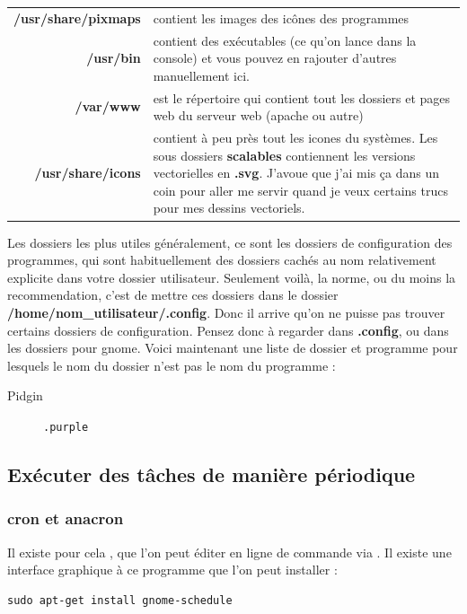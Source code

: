 \documentclass[a4paper,twoside]{article}
\begin{document}
\begin{tabular}{>{\bfseries}r<{}@{ : }p{9cm}}
/usr/share/pixmaps & contient les images des icônes des programmes\\
/usr/bin & contient des exécutables (ce qu'on lance dans la console) et vous pouvez en rajouter d'autres manuellement ici.\\
/var/www & est le répertoire qui contient tout les dossiers et pages web du serveur web (apache ou autre)\\
/usr/share/icons & contient à peu près tout les icones du systèmes. Les sous dossiers \textbf{scalables} contiennent les versions vectorielles en \textbf{.svg}. J'avoue que j'ai mis ça dans un coin pour aller me servir quand je veux certains trucs pour mes dessins vectoriels.
\end{tabular}

Les dossiers les plus utiles généralement, ce sont les dossiers de configuration des programmes, qui sont habituellement des dossiers cachés au nom relativement explicite dans votre dossier utilisateur. Seulement voilà, la norme, ou du moins la recommendation, c'est de mettre ces dossiers dans le dossier \textbf{/home/nom\_utilisateur/.config}. Donc il arrive qu'on ne puisse pas trouver certains dossiers de configuration. Pensez donc à regarder dans \textbf{.config}, ou dans les dossiers pour gnome. Voici maintenant une liste de dossier et programme pour lesquels le nom du dossier n'est pas le nom du programme :

\begin{description}
\item[Pidgin] \verb|.purple|
\end{description}

\subsection{Exécuter des tâches de manière périodique}
\subsubsection{cron et anacron}\label{sec:cron}

Il existe pour cela , que l'on peut éditer en ligne de commande via . Il existe une interface graphique à ce programme que l'on peut installer :

\begin{verbatim}
sudo apt-get install gnome-schedule
\end{verbatim}
\end{document}
